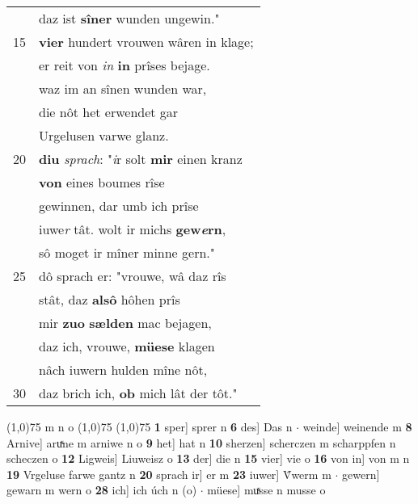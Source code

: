 \documentclass[8pt,a4paper,notitlepage]{article}
\begin{document}
\begin{table}[ht]
\begin{minipage}[t]{0.5\linewidth}
\begin{tabular}{rl}
 & daz ist \textbf{sîner} wunden ungewin."\\ 
15 & \textbf{vier} hundert vrouwen wâren in klage;\\ 
 & er reit von \textit{in} \textbf{in} prîses bejage.\\ 
 & waz im an sînen wunden war,\\ 
 & die nôt het erwendet gar\\ 
 & Urgelusen varwe glanz.\\ 
20 & \textbf{diu} \textit{sprach}: "\textit{i}r solt \textbf{mir} einen kranz\\ 
 & \textbf{von} eines boumes rîse\\ 
 & gewinnen, dar umb ich prîse\\ 
 & iuwe\textit{r} tât. wolt ir michs \textbf{gew\textit{e}rn},\\ 
 & sô moget ir mîner minne gern."\\ 
25 & dô sprach er: "vrouwe, wâ daz rîs\\ 
 & stât, daz \textbf{alsô} hôhen prîs\\ 
 & mir \textbf{zuo} \textbf{sælden} mac bejagen,\\ 
 & daz ich, vrouwe, \textbf{müese} klagen\\ 
 & nâch iuwern hulden mîne nôt,\\ 
30 & daz brich ich, \textbf{ob} mich lât der tôt."\\ 
\end{tabular}
\scriptsize
\line(1,0){75} \newline
m n o \newline
\line(1,0){75} \newline
\newline
\line(1,0){75} \newline
\textbf{1} sper] sprer n \textbf{6} des] Das n  $\cdot$ weinde] weinende m \textbf{8} Arnive] aruͯne m arniwe n o \textbf{9} het] hat n \textbf{10} sherzen] scherczen m scharppfen n scheczen o \textbf{12} Ligweis] Liuweisz o \textbf{13} der] die n \textbf{15} vier] vie o \textbf{16} von in] von m n \textbf{19} Vrgeluse farwe gantz n \textbf{20} sprach ir] er m \textbf{23} iuwer] V̂werm m  $\cdot$ gewern] gewarn m wern o \textbf{28} ich] ich úch n (o)  $\cdot$ müese] muͯsse n musse o \newline
\end{minipage}
\end{table}
\newpage
\end{document}

